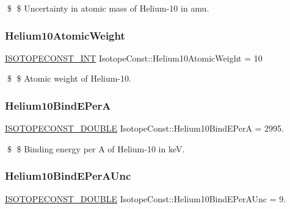 \$ \$ Uncertainty in atomic mass of Helium-\/10 in amu. \mbox{\label{group___isotope_const-_helium-_he10_ga015827910af310cc8986f2f901ea4835}} 
\subsubsection{\texorpdfstring{Helium10\+Atomic\+Weight}{Helium10AtomicWeight}}
{\footnotesize\ttfamily \mbox{\hyperlink{group___isotope_const-_macros_ga5f18360b3e99483a35c32d789e62621c}{I\+S\+O\+T\+O\+P\+E\+C\+O\+N\+S\+T\+\_\+\+I\+NT}} Isotope\+Const\+::\+Helium10\+Atomic\+Weight = 10}

\$ \$ Atomic weight of Helium-\/10. \mbox{\label{group___isotope_const-_helium-_he10_gac515281d741c9d78906cff7caae5c27d}} 
\subsubsection{\texorpdfstring{Helium10\+Bind\+E\+PerA}{Helium10BindEPerA}}
{\footnotesize\ttfamily \mbox{\hyperlink{group___isotope_const-_macros_ga8f45a7272ce02c0b4c65c44636ed719a}{I\+S\+O\+T\+O\+P\+E\+C\+O\+N\+S\+T\+\_\+\+D\+O\+U\+B\+LE}} Isotope\+Const\+::\+Helium10\+Bind\+E\+PerA = 2995.}

\$ \$ Binding energy per A of Helium-\/10 in keV. \mbox{\label{group___isotope_const-_helium-_he10_ga360b8fb1f825528c9e5d401f4926564d}} 
\subsubsection{\texorpdfstring{Helium10\+Bind\+E\+Per\+A\+Unc}{Helium10BindEPerAUnc}}
{\footnotesize\ttfamily \mbox{\hyperlink{group___isotope_const-_macros_ga8f45a7272ce02c0b4c65c44636ed719a}{I\+S\+O\+T\+O\+P\+E\+C\+O\+N\+S\+T\+\_\+\+D\+O\+U\+B\+LE}} Isotope\+Const\+::\+Helium10\+Bind\+E\+Per\+A\+Unc = 9.}

